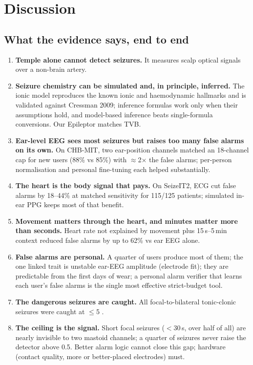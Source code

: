 \section{Discussion}
\label{sec:discussion}

\subsection{What the evidence says, end to end}

\begin{enumerate}
\item \textbf{Temple alone cannot detect seizures.} It measures scalp optical signals over a non-brain artery.
\item \textbf{Seizure chemistry can be simulated and, in principle, inferred.} The ionic model reproduces the known ionic and haemodynamic hallmarks and is validated against Cressman 2009; inference formulas work only when their assumptions hold, and model-based inference beats single-formula conversions. Our Epileptor matches TVB.
\item \textbf{Ear-level EEG sees most seizures but raises too many false alarms on its own.} On CHB-MIT, two ear-position channels matched an 18-channel cap for new users (88\% vs 85\%) with $\approx$2$\times$ the false alarms; per-person normalisation and personal fine-tuning each helped substantially.
\item \textbf{The heart is the body signal that pays.} On SeizeIT2, ECG cut false alarms by 18--44\% at matched sensitivity for 115/125 patients; simulated in-ear PPG keeps most of that benefit.
\item \textbf{Movement matters through the heart, and minutes matter more than seconds.} Heart rate not explained by movement plus 15\,s--5\,min context reduced false alarms by up to 62\% vs ear EEG alone.
\item \textbf{False alarms are personal.} A quarter of users produce most of them; the one linked trait is unstable ear-EEG amplitude (electrode fit); they are predictable from the first days of wear; a personal alarm verifier that learns each user's false alarms is the single most effective strict-budget tool.
\item \textbf{The dangerous seizures are caught.} All focal-to-bilateral tonic-clonic seizures were caught at $\le$5 \FAd.
\item \textbf{The ceiling is the signal.} Short focal seizures ($<$30\,s, over half of all) are nearly invisible to two mastoid channels; a quarter of seizures never raise the detector above 0.5. Better alarm logic cannot close this gap; hardware (contact quality, more or better-placed electrodes) must.
\end{enumerate}


